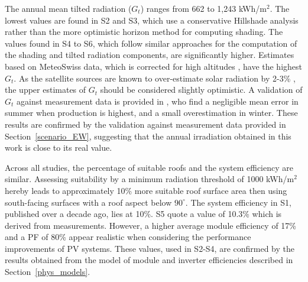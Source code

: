 The annual mean tilted radiation ($G_t$) ranges from 662 to 1,243 kWh/m$^2$. The lowest values are found in S2 and S3, which use a conservative Hillshade analysis rather than the more optimistic horizon method for computing shading. 
The values found in S4 to S6, which follow similar approaches for the computation of the shading and tilted radiation components, are significantly higher.
Estimates based on MeteoSwiss data, which is corrected for high altitudes \cite{buffat_scalable_2018}, have the highest $G_t$. As the satellite sources are known to over-estimate solar radiation by 2-3\% \cite{klauser_solarpotentialanalyse_2016}, the upper estimates of $G_t$ should be considered slightly optimistic.
A validation of $G_t$ against measurement data is provided in \cite{buffat_scalable_2018}, who find a negligible mean error in summer when production is highest, and a small overestimation in winter. 
These results are confirmed by the validation against measurement data provided in Section~\ref{scenario_EW}, suggesting that the annual irradiation obtained in this work is close to its real value. 

Across all studies, the percentage of suitable roofs and the system efficiency are similar.
Assessing suitability by a minimum radiation threshold of 1000 kWh/m$^2$ hereby leads to approximately 10\% more suitable roof surface area then using south-facing surfaces with a roof aspect below $90^\circ$. 
The system efficiency in S1, published over a decade ago, lies at 10\%. S5 quote a value of 10.3\% which is derived from measurements. However, a higher average module efficiency of 17\% and a PF of 80\% appear realistic when considering the performance improvements of PV systems. These values, used in S2-S4, are confirmed by the results obtained from the model of module and inverter efficiencies described in Section~\ref{phys_models}.

